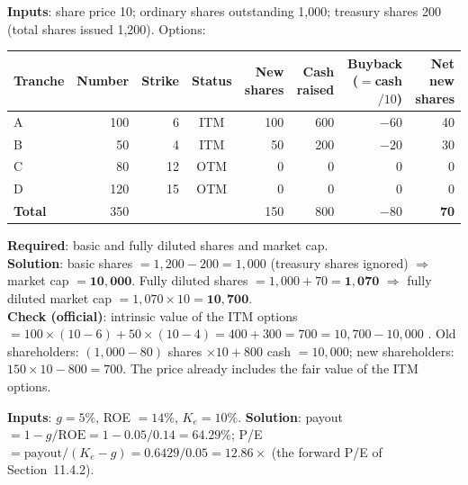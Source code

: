 \begin{exbox}
\textbf{Inputs}: share price 10; ordinary shares outstanding 1,000; treasury shares 200 (total shares issued 1,200). Options:
\begin{center}
\footnotesize
\begin{tabular}{@{}lrrcrrrr@{}}
\toprule
Tranche & Number & Strike & Status & New shares & Cash raised & Buyback ($=$cash$/10$) & Net new shares\\
\midrule
A & 100 & 6 & ITM & 100 & 600 & $-60$ & 40\\
B & 50 & 4 & ITM & 50 & 200 & $-20$ & 30\\
C & 80 & 12 & OTM & 0 & 0 & 0 & 0\\
D & 120 & 15 & OTM & 0 & 0 & 0 & 0\\
\midrule
\textbf{Total} & 350 & & & 150 & 800 & $-80$ & \textbf{70}\\
\bottomrule
\end{tabular}
\end{center}
\textbf{Required}: basic and fully diluted shares and market cap.\\
\textbf{Solution}: basic shares $=1{,}200-200=1{,}000$ (treasury shares ignored) $\Rightarrow$ market cap $=\mathbf{10{,}000}$. Fully diluted shares $=1{,}000+70=\mathbf{1{,}070}$ $\Rightarrow$ fully diluted market cap $=1{,}070\times10=\mathbf{10{,}700}$.\\
\textbf{Check (official)}: intrinsic value of the ITM options $=100\times(10-6)+50\times(10-4)=400+300=700=10{,}700-10{,}000$ \checkmark. Old shareholders: $(1{,}000-80)$ shares $\times10+800$ cash $=10{,}000$; new shareholders: $150\times10-800=700$. The price already includes the fair value of the ITM options.
\end{exbox}

\begin{exbox}
\textbf{Inputs}: $g=5\%$, ROE $=14\%$, $K_e=10\%$.\quad
\textbf{Solution}: payout $=1-g/\text{ROE}=1-0.05/0.14=\mathbf{64.29\%}$; P/E $=\text{payout}/(K_e-g)=0.6429/0.05=\mathbf{12.86\times}$ (the forward P/E of Section~11.4.2).
\end{exbox}

